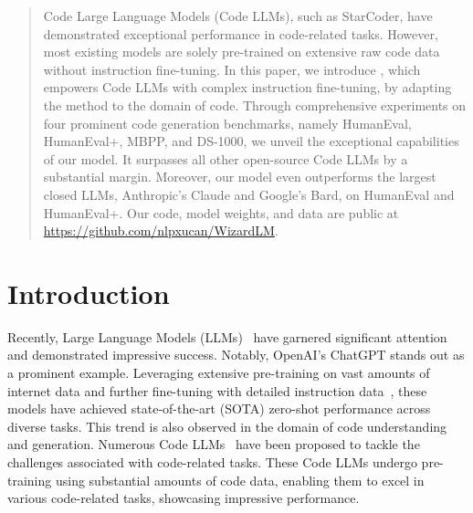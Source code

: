 \title{}



\maketitle
\newcommand{\todo}[1]{\textcolor{brown}{{[#1]}}}

\begin{abstract}

Code Large Language Models (Code LLMs), such as StarCoder, have demonstrated exceptional performance in code-related tasks. However, most existing models are solely pre-trained on extensive raw code data without instruction fine-tuning. In this paper, we introduce \modelname{}, which empowers Code LLMs with complex instruction fine-tuning, by adapting the \name{} method to the domain of code.
Through comprehensive experiments on four prominent code generation benchmarks, namely HumanEval, HumanEval+, MBPP, and DS-1000, we unveil the exceptional capabilities of our model. It surpasses all other open-source Code LLMs by a substantial margin. Moreover, our model even outperforms the largest closed LLMs, Anthropic’s Claude and Google’s Bard, on HumanEval and HumanEval+. Our code, model weights, and data are public at \url{https://github.com/nlpxucan/WizardLM}.

\end{abstract}\section{Introduction}

Recently, Large Language Models (LLMs)~\cite{GPT3,GPT4,PaLM,palm2,Chinchilla,gopher,GLM-130B,llama,opt} have garnered significant attention and demonstrated impressive success. Notably, OpenAI's ChatGPT stands out as a prominent example. Leveraging extensive pre-training on vast amounts of internet data and further fine-tuning with detailed instruction data~\cite{DBLP:conf/nips/Ouyang0JAWMZASR22}, these models have achieved state-of-the-art (SOTA) zero-shot performance across diverse tasks. This trend is also observed in the domain of code understanding and generation. Numerous Code LLMs~\cite{li2023starcoder,AlphaCode,codegen,CodeGeeX,incoder,codex,codet5,CodeT5+} have been proposed to tackle the challenges associated with code-related tasks. These Code LLMs undergo pre-training using substantial amounts of code data, enabling them to excel in various code-related tasks, showcasing impressive performance.

